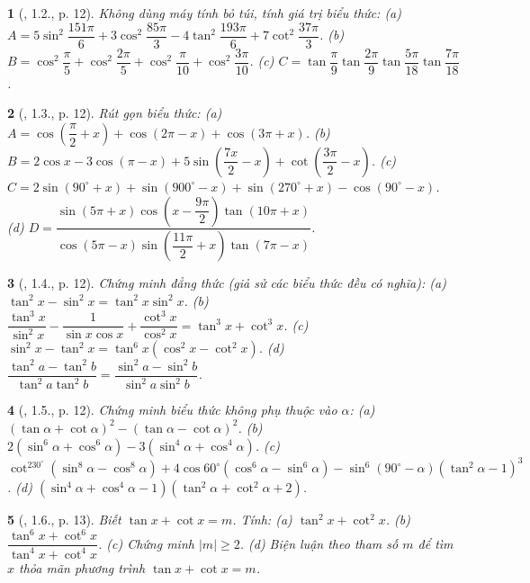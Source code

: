 \documentclass{article}
\newtheorem{baitoan}{}
\begin{document}
\begin{baitoan}[\cite{Hung_nang_cao_phat_trien_Toan_11_tap_1}, 1.2., p. 12]
	Không dùng máy tính bỏ túi, tính giá trị biểu thức: (a) $A = 5\sin^2\dfrac{151\pi}{6} + 3\cos^2\dfrac{85\pi}{3} - 4\tan^2\dfrac{193\pi}{6} + 7\cot^2\dfrac{37\pi}{3}$. (b) $B = \cos^2\dfrac{\pi}{5} + \cos^2\dfrac{2\pi}{5} + \cos^2\dfrac{\pi}{10} + \cos^2\dfrac{3\pi}{10}$. (c) $C = \tan\dfrac{\pi}{9}\tan\dfrac{2\pi}{9}\tan\dfrac{5\pi}{18}\tan\dfrac{7\pi}{18}$.
\end{baitoan}

\begin{baitoan}[\cite{Hung_nang_cao_phat_trien_Toan_11_tap_1}, 1.3., p. 12]
	Rút gọn biểu thức: (a) $A = \cos\left(\dfrac{\pi}{2} + x\right) + \cos(2\pi - x) + \cos(3\pi + x)$. (b) $B = 2\cos x - 3\cos(\pi - x) + 5\sin\left(\dfrac{7x}{2} - x\right) + \cot\left(\dfrac{3\pi}{2} - x\right)$. (c) $C = 2\sin(90^\circ + x) + \sin(900^\circ - x) + \sin(270^\circ + x) - \cos(90^\circ - x)$. (d) $D = \dfrac{\sin(5\pi + x)\cos\left(x - \dfrac{9\pi}{2}\right)\tan(10\pi + x)}{\cos(5\pi - x)\sin\left(\dfrac{11\pi}{2} + x\right)\tan(7\pi - x)}$.
\end{baitoan}

\begin{baitoan}[\cite{Hung_nang_cao_phat_trien_Toan_11_tap_1}, 1.4., p. 12]
	Chứng minh đẳng thức (giả sử các biểu thức đều có nghĩa): (a) $\tan^2x - \sin^2x = \tan^2x\sin^2x$. (b) $\dfrac{\tan^3x}{\sin^2x} - \dfrac{1}{\sin x\cos x} + \dfrac{\cot^3x}{\cos^2x} = \tan^3x + \cot^3x$. (c) $\sin^2x - \tan^2x = \tan^6x(\cos^2x - \cot^2x)$. (d) $\dfrac{\tan^2a - \tan^2b}{\tan^2a\tan^2b} = \dfrac{\sin^2a - \sin^2b}{\sin^2a\sin^2b}$.
\end{baitoan}

\begin{baitoan}[\cite{Hung_nang_cao_phat_trien_Toan_11_tap_1}, 1.5., p. 12]
	Chứng minh biểu thức không phụ thuộc vào $\alpha$: (a) $(\tan\alpha + \cot\alpha)^2 - (\tan\alpha - \cot\alpha)^2$. (b) $2(\sin^6\alpha + \cos^6\alpha) - 3(\sin^4\alpha + \cos^4\alpha)$. (c) $\cot^230^\circ(\sin^8\alpha - \cos^8\alpha) + 4\cos60^\circ(\cos^6\alpha - \sin^6\alpha) - \sin^6(90^\circ - \alpha)(\tan^2\alpha - 1)^3$. (d) $(\sin^4\alpha + \cos^4\alpha - 1)(\tan^2\alpha + \cot^2\alpha + 2)$.
\end{baitoan}

\begin{baitoan}[\cite{Hung_nang_cao_phat_trien_Toan_11_tap_1}, 1.6., p. 13]
	Biết $\tan x + \cot x = m$. Tính: (a) $\tan^2x + \cot^2x$. (b) $\dfrac{\tan^6x + \cot^6x}{\tan^4x + \cot^4x}$. (c) Chứng minh $|m|\ge2$. (d) Biện luận theo tham số $m$ để tìm $x$ thỏa mãn phương trình $\tan x + \cot x = m$.
\end{baitoan}
\end{document}
